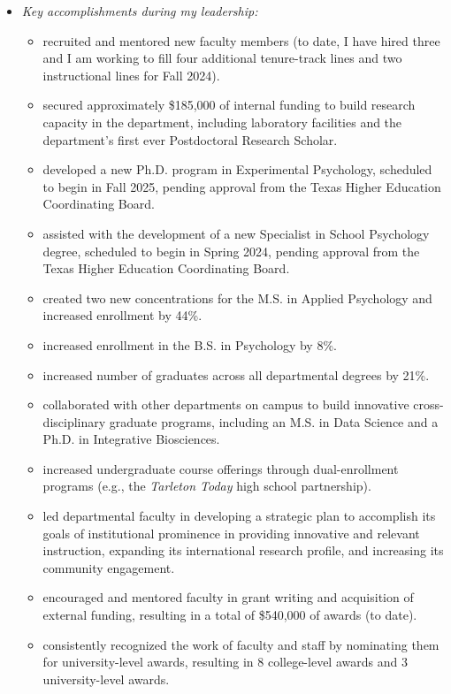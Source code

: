 \documentclass[article,10pt]{article}
\begin{document}
\begin{itemize}
\item \emph{Key accomplishments during my leadership:}
\begin{itemize}
\item recruited and mentored new faculty members (to date, I have hired three and I am working to fill four additional tenure-track lines and two instructional lines for Fall 2024).
\item secured approximately \$185,000 of internal funding to build research capacity in the department, including laboratory facilities and the department's first ever Postdoctoral Research Scholar.
\item developed a new Ph.D. program in Experimental Psychology, scheduled to begin in Fall 2025, pending approval from the Texas Higher Education Coordinating Board.
\item assisted with the development of a new Specialist in School Psychology degree, scheduled to begin in Spring 2024, pending approval from the Texas Higher Education Coordinating Board.
\item created two new concentrations for the M.S. in Applied Psychology and increased enrollment by 44\%.
\item increased enrollment in the B.S. in Psychology by 8\%.
\item increased number of graduates across all departmental degrees by 21\%.
\item collaborated with other departments on campus to build innovative cross-disciplinary graduate programs, including an M.S. in Data Science and a Ph.D. in Integrative Biosciences.
\item increased undergraduate course offerings through dual-enrollment programs (e.g., the \emph{Tarleton Today} high school partnership).
\item led departmental faculty in developing a strategic plan to accomplish its goals of institutional prominence in providing innovative and relevant instruction, expanding its international research profile, and increasing its community engagement.
\item encouraged and mentored faculty in grant writing and acquisition of external funding, resulting in a total of \$540,000 of awards (to date).
\item consistently recognized the work of faculty and staff by nominating them for university-level awards, resulting in 8 college-level awards and 3 university-level awards.
\end{itemize}
\end{itemize}
\end{document}
